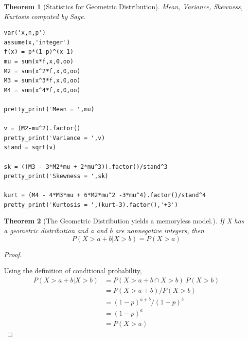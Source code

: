 \documentclass[10pt,]{book}
\theoremstyle{plain}
\newtheorem{theorem}{Theorem}[section]
\theoremstyle{definition}
\theoremstyle{definition}
\theoremstyle{definition}
\numberwithin{equation}{section}
\begin{document}
\begin{theorem}[{Statistics for Geometric Distribution}]\label{theorem-45}
Mean, Variance, Skewness, Kurtosis computed by Sage.
		
\begin{lstlisting}[style=sageinput]
var('x,n,p')
assume(x,'integer')
f(x) = p*(1-p)^(x-1)
mu = sum(x*f,x,0,oo)
M2 = sum(x^2*f,x,0,oo)
M3 = sum(x^3*f,x,0,oo)
M4 = sum(x^4*f,x,0,oo)

pretty_print('Mean = ',mu)

v = (M2-mu^2).factor()
pretty_print('Variance = ',v)
stand = sqrt(v)

sk = ((M3 - 3*M2*mu + 2*mu^3)).factor()/stand^3
pretty_print('Skewness = ',sk)

kurt = (M4 - 4*M3*mu + 6*M2*mu^2 -3*mu^4).factor()/stand^4
pretty_print('Kurtosis = ',(kurt-3).factor(),'+3')
\end{lstlisting}
\end{theorem}
\begin{theorem}[{The Geometric Distribution yields a memoryless model.}]\label{theorem-46}
If X has a geometric distribution and a and b are nonnegative integers, then
	\begin{equation*}P( X > a + b | X > b ) = P( X > a)\end{equation*}
\end{theorem}
\begin{proof}\hypertarget{proof-42}{}
Using the definition of conditional probability,
	\begin{align*}
P( X > a + b | X > b ) & = P( X > a + b \cap X > b ) \ P( X > b)\\
 & = P( X > a + b ) / P( X > b)\\
 & = (1-p)^{a+b} / (1-p)^b\\
 & = (1-p)^a\\
 & = P(X > a)
\end{align*}
\end{proof}
\typeout{************************************************}
\typeout{************************************************}
\end{document}
